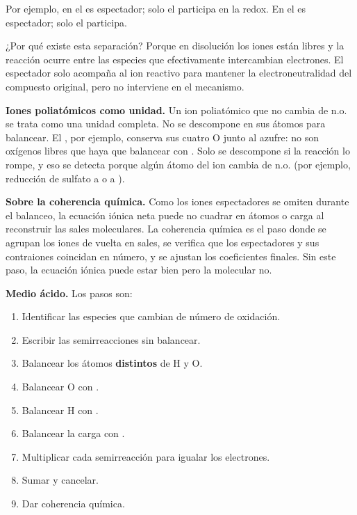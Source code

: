 Por ejemplo, en  el  es espectador; solo el
 participa en la redox. En  el 
es espectador; solo el  participa.

¿Por qué existe esta separación? Porque en disolución los iones
están libres y la reacción ocurre entre las especies que
efectivamente intercambian electrones. El espectador solo
acompaña al ion reactivo para mantener la electroneutralidad del
compuesto original, pero no interviene en el mecanismo.

\begin{notaimportante}
\textbf{Iones poliatómicos como unidad.} Un ion poliatómico que
no cambia de n.o. se trata como una unidad completa. No se
descompone en sus átomos para balancear. El , por
ejemplo, conserva sus cuatro O junto al azufre: no son oxígenos
libres que haya que balancear con . Solo se descompone
si la reacción lo rompe, y eso se detecta porque algún átomo del
ion cambia de n.o. (por ejemplo, reducción de sulfato a 
o a ).
\end{notaimportante}

\begin{notaimportante}
\textbf{Sobre la coherencia química.} Como los iones espectadores
se omiten durante el balanceo, la ecuación iónica neta puede no
cuadrar en átomos o carga al reconstruir las sales moleculares.
La coherencia química es el paso donde se agrupan los iones de
vuelta en sales, se verifica que los espectadores y sus
contraiones coincidan en número, y se ajustan los coeficientes
finales. Sin este paso, la ecuación iónica puede estar bien pero
la molecular no.
\end{notaimportante}

\textbf{Medio ácido.} Los pasos son:
\begin{enumerate}
    \item Identificar las especies que cambian de número de
    oxidación.
    \item Escribir las semirreacciones sin balancear.
    \item Balancear los átomos \textbf{distintos} de H y O.
    \item Balancear O con .
    \item Balancear H con .
    \item Balancear la carga con .
    \item Multiplicar cada semirreacción para igualar los
    electrones.
    \item Sumar y cancelar.
    \item Dar coherencia química.
\end{enumerate}

